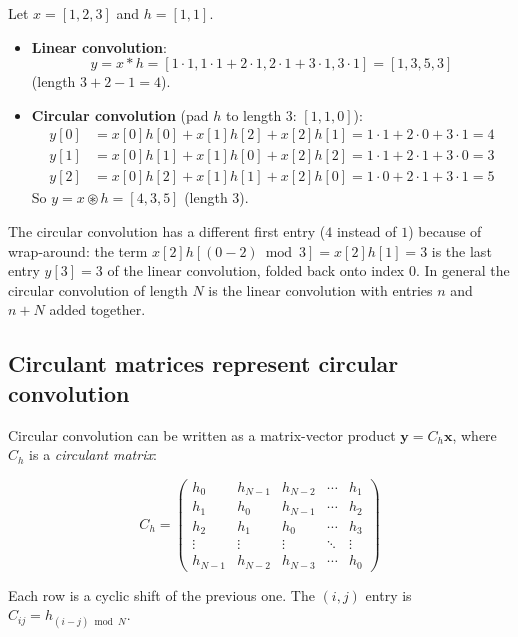 \begin{notechapter}
\begin{example}
Let $x = [1, 2, 3]$ and $h = [1, 1]$.
\begin{itemize}
\item \textbf{Linear convolution}:
  \[
  y = x * h = [1\cdot1, 1\cdot1+2\cdot1, 2\cdot1+3\cdot1, 3\cdot1]
    = [1, 3, 5, 3]
  \]
  (length $3+2-1 = 4$).
\item \textbf{Circular convolution} (pad $h$ to length 3: $[1, 1, 0]$):
  \begin{align*}
  y[0] &= x[0]h[0] + x[1]h[2] + x[2]h[1] = 1\cdot1 + 2\cdot0 + 3\cdot1 = 4 \\
  y[1] &= x[0]h[1] + x[1]h[0] + x[2]h[2] = 1\cdot1 + 2\cdot1 + 3\cdot0 = 3 \\
  y[2] &= x[0]h[2] + x[1]h[1] + x[2]h[0] = 1\cdot0 + 2\cdot1 + 3\cdot1 = 5
  \end{align*}
  So $y = x \circledast h = [4, 3, 5]$ (length 3).
\end{itemize}
The circular convolution has a different first entry ($4$ instead of $1$) because of wrap-around: the term $x[2]h[(0-2)\bmod 3] = x[2]h[1] = 3$ is the last entry $y[3] = 3$ of the linear convolution, folded back onto index $0$. In general the circular convolution of length $N$ is the linear convolution with entries $n$ and $n+N$ added together.
\end{example}

\subsection{Circulant matrices represent circular convolution}

Circular convolution can be written as a matrix-vector product
$\mathbf{y} = C_h \mathbf{x}$, where $C_h$ is a \emph{circulant
matrix}:

\begin{equation}
C_h = \begin{pmatrix}
h_0 & h_{N-1} & h_{N-2} & \cdots & h_1 \\
h_1 & h_0 & h_{N-1} & \cdots & h_2 \\
h_2 & h_1 & h_0 & \cdots & h_3 \\
\vdots & \vdots & \vdots & \ddots & \vdots \\
h_{N-1} & h_{N-2} & h_{N-3} & \cdots & h_0
\end{pmatrix}
\end{equation}

Each row is a cyclic shift of the previous one. The $(i,j)$ entry is
$C_{ij} = h_{(i-j) \bmod N}$.


\end{notechapter}
